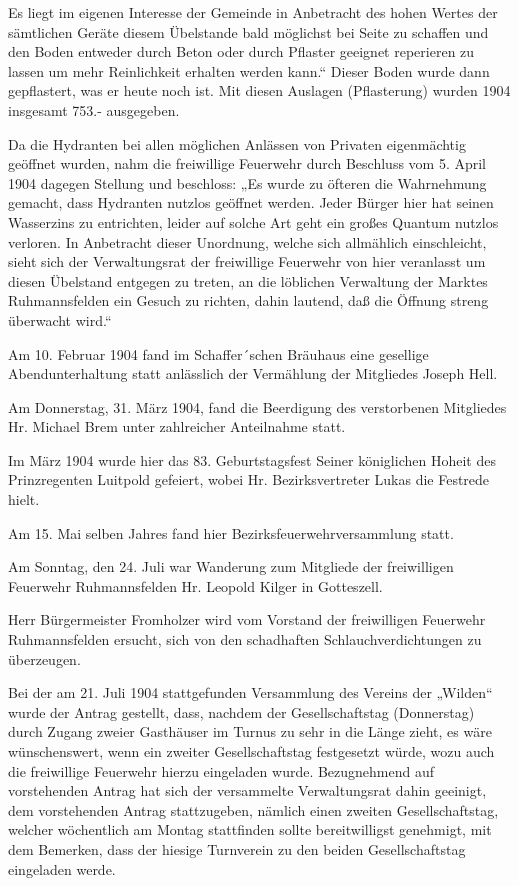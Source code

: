 \documentclass{book}
\begin{document}
Es liegt im eigenen Interesse der Gemeinde in Anbetracht des hohen Wertes der
sämtlichen Geräte diesem Übelstande bald möglichst bei Seite zu schaffen und den
Boden entweder durch Beton oder durch Pflaster geeignet reperieren zu lassen um
mehr Reinlichkeit erhalten werden kann.“ Dieser Boden wurde dann gepflastert,
was er heute noch ist. Mit diesen Auslagen (Pflasterung) wurden 1904 insgesamt
753.- ausgegeben.

Da die Hydranten bei allen möglichen Anlässen von Privaten eigenmächtig geöffnet
wurden, nahm die freiwillige Feuerwehr durch Beschluss vom 5. April 1904 dagegen
Stellung und beschloss: „Es wurde zu öfteren die Wahrnehmung gemacht, dass
Hydranten nutzlos geöffnet werden. Jeder Bürger hier hat seinen Wasserzins zu
entrichten, leider auf solche Art geht ein großes Quantum nutzlos verloren. In
Anbetracht dieser Unordnung, welche sich allmählich einschleicht, sieht sich der
Verwaltungsrat der freiwillige Feuerwehr von hier veranlasst um diesen Übelstand
entgegen zu treten, an die löblichen Verwaltung der Marktes Ruhmannsfelden ein
Gesuch zu richten, dahin lautend, daß die Öffnung streng überwacht wird.“

Am 10. Februar 1904 fand im Schaffer´schen Bräuhaus eine gesellige
Abendunterhaltung statt anlässlich der Vermählung der Mitgliedes Joseph Hell.

Am Donnerstag, 31. März 1904, fand die Beerdigung des verstorbenen Mitgliedes
Hr. Michael Brem unter zahlreicher Anteilnahme statt.

Im März 1904 wurde hier das 83. Geburtstagsfest Seiner königlichen Hoheit des
Prinzregenten Luitpold gefeiert, wobei Hr. Bezirksvertreter Lukas die Festrede
hielt.

Am 15. Mai selben Jahres fand hier Bezirksfeuerwehrversammlung statt.

Am Sonntag, den 24. Juli war Wanderung zum Mitgliede der freiwilligen Feuerwehr
Ruhmannsfelden Hr. Leopold Kilger in Gotteszell.

Herr Bürgermeister Fromholzer wird vom Vorstand der freiwilligen Feuerwehr
Ruhmannsfelden ersucht, sich von den schadhaften Schlauchverdichtungen zu
überzeugen.

Bei der am 21. Juli 1904 stattgefunden Versammlung des Vereins der „Wilden“
wurde der Antrag gestellt, dass, nachdem der Gesellschaftstag (Donnerstag) durch
Zugang zweier Gasthäuser im Turnus zu sehr in die Länge zieht, es wäre
wünschenswert, wenn ein zweiter Gesellschaftstag festgesetzt würde, wozu auch
die freiwillige Feuerwehr hierzu eingeladen wurde. Bezugnehmend auf vorstehenden
Antrag hat sich der versammelte Verwaltungsrat dahin geeinigt, dem vorstehenden
Antrag stattzugeben, nämlich einen zweiten Gesellschaftstag, welcher wöchentlich
am Montag stattfinden sollte bereitwilligst genehmigt, mit dem Bemerken, dass
der hiesige Turnverein zu den beiden Gesellschaftstag eingeladen werde.
\end{document}
